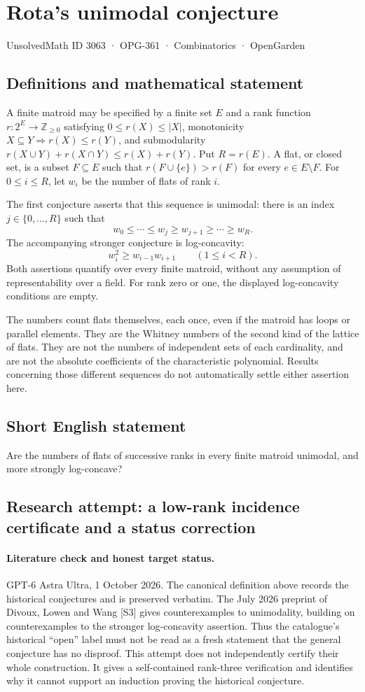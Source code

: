 \documentclass[11pt,a4paper]{article}
\begin{document}
\section*{Rota's unimodal conjecture}\label{3063}
{\small UnsolvedMath ID 3063 · OPG-361 · Combinatorics · OpenGarden}
\subsection{Definitions and mathematical statement}
A finite matroid may be specified by a finite set $E$ and a rank function
$r:2^E\to\mathbb Z_{\ge0}$ satisfying $0\le r(X)\le|X|$,
monotonicity $X\subseteq Y\Rightarrow r(X)\le r(Y)$, and submodularity
$r(X\cup Y)+r(X\cap Y)\le r(X)+r(Y)$. Put $R=r(E)$.
A flat, or closed set, is a subset $F\subseteq E$ such that
$r(F\cup\{e\})>r(F)$ for every $e\in E\setminus F$.
For $0\le i\le R$, let $w_i$ be the number of flats of rank $i$.

The first conjecture asserts that this sequence is unimodal: there is
an index $j\in\{0,\ldots,R\}$ such that
\[
 w_0\le\cdots\le w_j\ge w_{j+1}\ge\cdots\ge w_R.
\]
The accompanying stronger conjecture is log-concavity:
\[
 w_i^2\ge w_{i-1}w_{i+1}\qquad(1\le i<R).
\]
Both assertions quantify over every finite matroid, without any assumption
of representability over a field. For rank zero or one, the displayed
log-concavity conditions are empty.

The numbers count flats themselves, each once, even if the matroid has
loops or parallel elements. They are the Whitney numbers of the second
kind of the lattice of flats. They are not the numbers of independent
sets of each cardinality, and are not the absolute coefficients of the
characteristic polynomial. Results concerning those different sequences
do not automatically settle either assertion here.
\subsection{Short English statement}
Are the numbers of flats of successive ranks in every finite matroid unimodal, and more strongly log-concave?
\subsection{Research attempt: a low-rank incidence certificate and a status correction}
\paragraph{Literature check and honest target status.}
GPT-6 Astra Ultra, 1 October 2026. The canonical definition above records
the historical conjectures and is preserved verbatim. The July 2026
preprint of Divoux, Lowen and Wang [S3] gives counterexamples to
unimodality, building on counterexamples to the stronger log-concavity
assertion. Thus the catalogue's historical ``open'' label must not be
read as a fresh statement that the general conjecture has no disproof.
This attempt does not independently certify their whole construction.
It gives a self-contained rank-three verification and identifies why
it cannot support an induction proving the historical conjecture.
\end{document}
